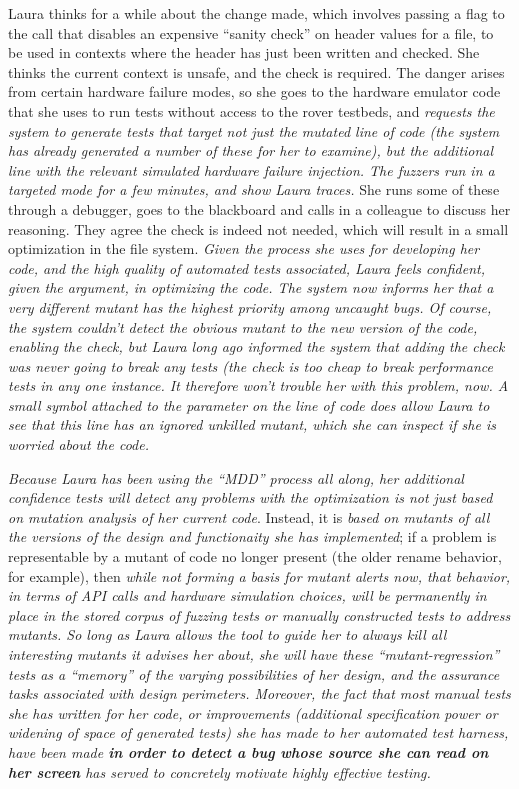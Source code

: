 Laura thinks for a while about the change made, which involves passing a flag to the call that disables an expensive ``sanity check'' on header values for a file, to be used in contexts where the header has just been written and checked.  She thinks the current context is unsafe, and the check is required.  The danger arises from certain hardware failure modes, so she goes to the hardware emulator code that she uses to run tests without access to the rover testbeds, and \emph{requests the system to generate tests that target not just the mutated line of code (the system has already generated a number of these for her to examine), but the additional line with the relevant simulated hardware failure injection.  The fuzzers run in a targeted mode for a few minutes, and show Laura traces.}  She runs some of these through a debugger, goes to the blackboard and calls in a colleague to discuss her reasoning.  They agree the check is indeed not needed, which will result in a small optimization in the file system.  \emph{Given the process she uses for developing her code, and the high quality of automated tests associated, Laura feels confident, given the argument, in optimizing the code.  The system now informs her that a very different mutant has the highest priority among uncaught bugs.  Of course, the system couldn't detect the obvious mutant to the new version of the code, enabling the check, but Laura long ago informed the system that adding the check was never going to break any tests (the check is too cheap to break performance tests in any one instance.  It therefore won't trouble her with this problem, now.  A small symbol attached to the parameter on the line of code does allow Laura to see that this line has an ignored unkilled mutant, which she can inspect if she is worried about the code.}

    \emph{Because Laura has been using the ``MDD'' process all along, her additional confidence tests will detect any problems with the optimization is not just based on mutation analysis of her current code}.  Instead, it is \emph{based on mutants of all the versions of the design and functionaity she has implemented}; if a problem is representable by a mutant of code no longer present (the older rename behavior, for example), then \emph{while not forming a basis for mutant alerts now, that behavior, in terms of API calls and hardware simulation choices, will be permanently in place in the stored corpus of fuzzing tests or manually constructed tests to address mutants.  So long as Laura allows the tool to guide her to always kill all interesting mutants it advises her about, she will have these ``mutant-regression'' tests as a ``memory'' of the varying possibilities of her design, and the assurance tasks associated with design perimeters.  Moreover, the fact that most manual tests she has written for her code, or improvements (additional specification power or widening of space of generated tests) she has made to her automated test harness, have been made {\bf in order to detect a bug whose source she can read on her screen} has served to concretely motivate highly effective testing.}
